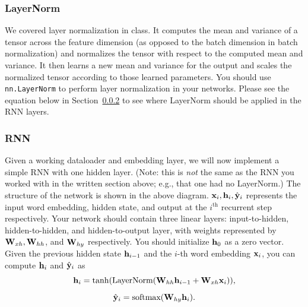 \subsubsection{LayerNorm} 

We covered layer normalization in class. It computes the mean and variance of a tensor across the feature dimension (as opposed to the batch dimension in batch normalization) and normalizes the tensor with respect to the computed mean and variance. It then learns a new mean and variance for the output and scales the normalized tensor according to those learned parameters. You should use \texttt{nn.LayerNorm} to perform layer normalization in your networks. Please see the equation below in Section~\ref{sec:RNN} to see where LayerNorm should be applied in the RNN layers.

\subsubsection{RNN} 
\label{sec:RNN}

\begin{center}
\end{center}

Given a working dataloader and embedding layer, we will now implement a simple RNN with one hidden layer. (Note: this is \emph{not} the same as the RNN you worked with in the written section above; e.g., that one had no LayerNorm.) The structure of the network is shown in the above diagram. $\mathbf{x}_i, \mathbf{h}_i, \hat{\mathbf{y}}_i$ represents the input word embedding, hidden state, and output at the $i^{\textrm{th}}$ recurrent step respectively. Your network should contain three linear layers: input-to-hidden, hidden-to-hidden, and hidden-to-output layer, with weights represented by $\mathbf{W}_{xh}, \mathbf{W}_{hh}$, and $\mathbf{W}_{hy}$ respectively. You should initialize $\mathbf{h}_0$ as a zero vector. Given the previous hidden state $\mathbf{h}_{i-1}$ and the $i$-th word embedding $\mathbf{x}_i$, you can compute $\mathbf{h}_i$ and $\hat{\mathbf{y}}_i$ as
\[
\mathbf{h}_i = \tanh(\textrm{LayerNorm}(\mathbf{W}_{hh} \mathbf{h}_{i-1} + \mathbf{W}_{xh} \mathbf{x}_i)), 
\]
\[
\hat{\mathbf{y}}_i = \textrm{softmax}(\mathbf{W}_{hy} \mathbf{h}_i).
\]

